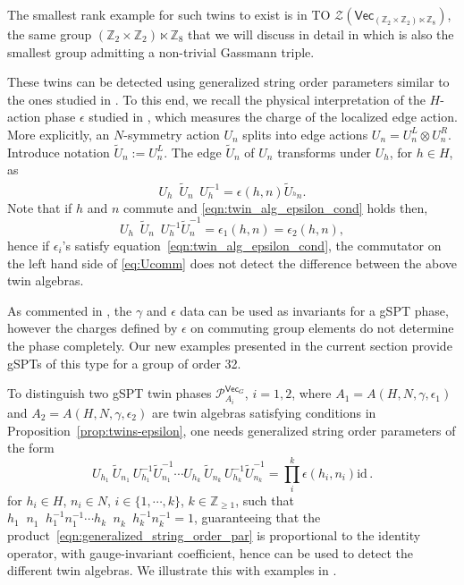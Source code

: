 \documentclass[aps,twocolumn,prx,floatfix,preprintnumbers, nofootinbib,10pt]{revtex4-2}
\numberwithin{equation}{section}
\theoremstyle{definition}
\newcommand{\be}{\begin{equation}}
\newcommand{\ee}{\end{equation}}
\newcommand{\id}{\text{id}}
\newcommand{\wt}{\widetilde}
\newcommand{\Z}{{\mathbb Z}}
\newcommand{\cP}{\mathcal{P}}
\newcommand{\cZ}{\mathcal{Z}}
\renewcommand{\Vec}{\mathsf{Vec}}
\newcommand{\eps}{\epsilon}
\begin{document}
The smallest rank example for such twins to exist is in TO $\cZ(\Vec_{(\Z_2\times \Z_2) \ltimes \Z_8})$, the same group $(\Z_2\times \Z_2) \ltimes \Z_8$ that we will discuss in detail in  which is also the smallest group admitting a non-trivial Gassmann triple.

These twins can be detected using generalized string order parameters similar to the ones studied in \cite{Haegeman:2012pex, Pollmann:2012}. 
To this end, we recall the physical interpretation of the $H$-action phase $\epsilon$ studied in \cite{Wen:2023otf}, which measures the charge of the localized edge action. More explicitly, an $N$-symmetry action $U_n$ splits into edge actions $U_n=U_n^L \otimes U_n^R$. Introduce notation $\wt{U}_n:=U_n^L$. The edge $\wt{U}_n$ of $U_n$ transforms under $U_h$, for $h\in H$, as
\be
    U_h^{\phantom{-1}}\!\!\!\! \wt{U}_n^{\phantom{-1}}\!\!\!\! U_h^{-1} = \epsilon(h, n) \wt{U}_{{}^hn}.
\ee
Note that if $h$ and $n$ commute and \eqref{eqn:twin_alg_epsilon_cond} holds then, 
\be \label{eq:Ucomm}
    U_{h}^{\phantom{-1}}\!\!\!\! \wt{U}_{n}^{\phantom{-1}}\!\!\!\! U_{h}^{-1} \wt{U}_{n}^{-1} = \epsilon_1(h, n) = \epsilon_2(h, n),
\ee
hence if $\eps_i$'s satisfy equation~\eqref{eqn:twin_alg_epsilon_cond}, the commutator on the left hand side of \eqref{eq:Ucomm} does not detect the difference between the above twin algebras. 

As commented in \cite{Wen:2023otf}, the $\gamma$ and $\epsilon$ data can be used as invariants for a gSPT phase, however the charges defined by $\epsilon$ on commuting group elements do not determine the phase completely. Our new examples presented in the current section provide gSPTs of this type for a group of order 32.

To distinguish two gSPT twin phases $\cP^{\Vec_G}_{A_i}$, $i=1,2$, where $A_1=A(H, N, \gamma, \epsilon_1)$ and $A_2=A(H, N, \gamma, \epsilon_2)$ are twin algebras satisfying conditions in Proposition~\ref{prop:twins-epsilon}, one needs generalized string order parameters of the form 
\be
\label{eqn:generalized_string_order_par}
    U_{h_1}^{\phantom{-1}}\!\!\wt{U}_{n_1}^{\phantom{-1}}\!\!U_{h_1}^{-1}\wt{U}_{n_1}^{-1}\cdots U_{h_k}^{\phantom{-1}}\!\!\wt{U}_{n_k}^{\phantom{-1}}\!\!U_{h_k}^{-1}\wt{U}_{n_k}^{-1} = \prod_{i}^{k}\epsilon(h_i, n_i)\id\,.
\ee
for $h_i\in H$, $n_i\in N$, $i\in \{1, \cdots, k\}$, $k\in \mathbb{Z}_{\geq1}$, such that $h_1^{\phantom{-1}}\!\!\!\! n_1^{\phantom{-1}}\!\!\!\! h_1^{-1} n_1^{-1}\cdots h_k^{\phantom{-1}}\!\!\!\! n_k^{\phantom{-1}}\!\!\!\! h_k^{-1} n_k^{-1}=1$, guaranteeing that the product~\eqref{eqn:generalized_string_order_par} is proportional to the identity operator, with gauge-invariant coefficient, hence can be used to detect the different twin algebras. We illustrate this with examples in .
\end{document}
